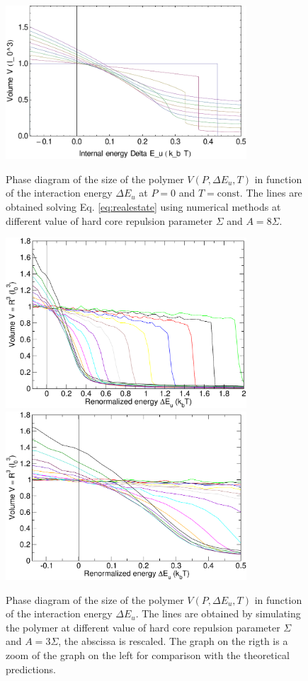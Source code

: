 \documentclass[12pt,a4paper,notitlepage]{article}
\begin{document}
\begin{figure}[h!]
\centering
\includegraphics[width=9cm]{colrealAS}
\caption{Phase diagram of the size of the polymer $V(P,\Delta E_u,T)$ in
  function of the interaction energy $\Delta E_u$ at $P = 0$ and $T = 
  \mathrm{const}$. The lines are obtained solving Eq.
  \ref{eq:realestate} using numerical methods at different value of
  hard core repulsion parameter $\Sigma$ and $A = 8 \Sigma$.}
\label{fig:colreal}
\vspace{5mm}
\includegraphics[width=9cm]{colrealSIM}\includegraphics[width=9cm]{colrealSIMsmall}\\
\caption{Phase diagram of the size of the polymer $V(P,\Delta E_u,T)$ in
  function of the interaction energy $\Delta E_u$. The lines are
  obtained by simulating the polymer at different value of hard core
  repulsion parameter $\Sigma$ and $A = 3 \Sigma$, the abscissa is
  rescaled. The graph on the rigth is a zoom of the graph on the left
  for comparison with the theoretical predictions.}
\label{fig:colrealsim}
\end{figure}
\end{document}
